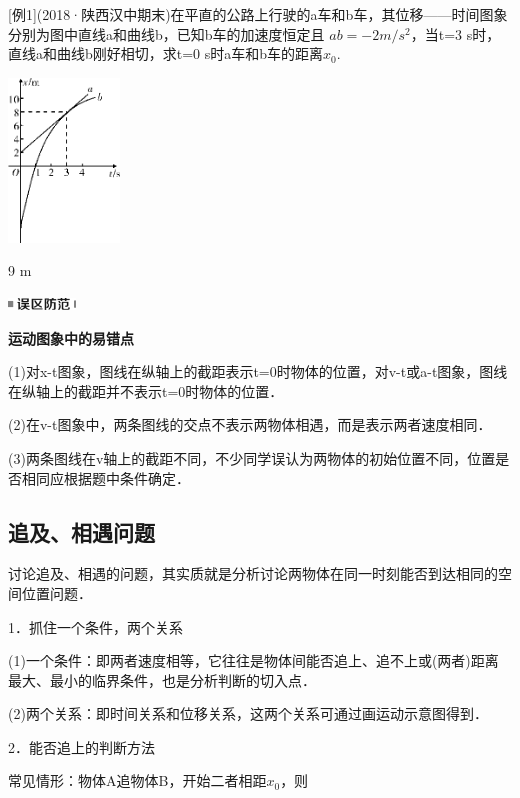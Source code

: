 {[}例1{]}(2018·陕西汉中期末)在平直的公路上行驶的a车和b车，其位移——时间图象分别为图中直线a和曲线b，已知b车的加速度恒定且
$ab=-2m/s^2$，当t=3 s时，直线a和曲线b刚好相切，求t=0 s时a车和b车的距离$x_0$.

\begin{center}\includegraphics[width=1.16667in,height=1.71875in]{media/image33.png}\end{center}

\begin{solution}
	9 m
\end{solution}
\begin{center}\includegraphics[width=0.70833in,height=0.125in]{media/image34.png}

\textbf{运动图象中的易错点}
\end{center}


(1)对x-t图象，图线在纵轴上的截距表示t=0时物体的位置，对v-t或a-t图象，图线在纵轴上的截距并不表示t=0时物体的位置．

(2)在v-t图象中，两条图线的交点不表示两物体相遇，而是表示两者速度相同．

(3)两条图线在v轴上的截距不同，不少同学误认为两物体的初始位置不同，位置是否相同应根据题中条件确定．
\newpage
\subsection{追及、相遇问题}

讨论追及、相遇的问题，其实质就是分析讨论两物体在同一时刻能否到达相同的空间位置问题．

1．抓住一个条件，两个关系

(1)一个条件：即两者速度相等，它往往是物体间能否追上、追不上或(两者)距离最大、最小的临界条件，也是分析判断的切入点．

(2)两个关系：即时间关系和位移关系，这两个关系可通过画运动示意图得到．

2．能否追上的判断方法

常见情形：物体A追物体B，开始二者相距$x_0$，则

